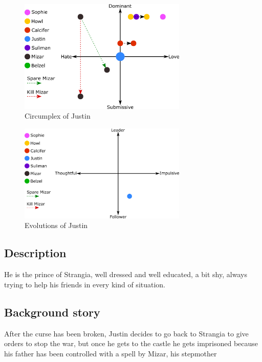 \begin{figure}[H]
  \centering
  \includegraphics[width=8cm]{Images/SVG/Exported/Circumplexes/justinCircumplex}
  \caption{Circumplex of Justin}
\end{figure}

\begin{figure}[H]
  \centering
   \includegraphics[width=8cm]{Images/SVG/Exported/Evolutions/justinEvolution}
  \caption{Evolutions of Justin}
\end{figure}

\subsection{Description}
He is the prince of Strangia, well dressed and well educated, a bit shy, always trying to help his friends in every kind of situation.

\subsection{Background story}
 After the curse has been broken, Justin decides to go back to Strangia to give orders to stop the war, but once he gets to the castle he gets imprisoned because his father has been controlled with a spell by Mizar, his stepmother



